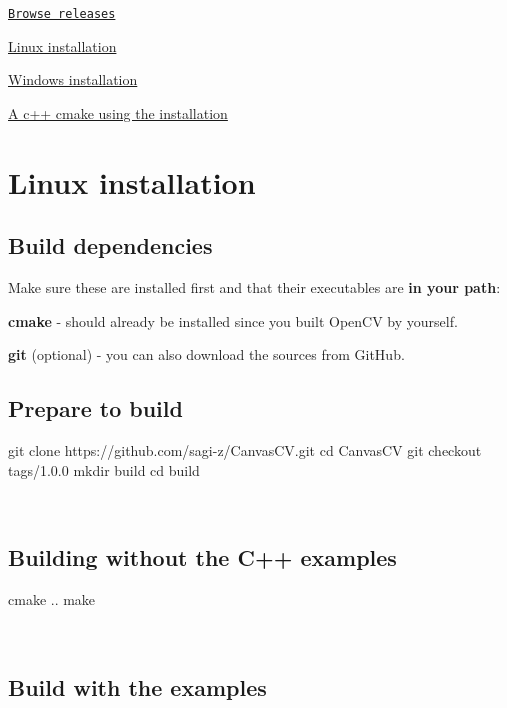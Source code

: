 
\begin{DoxyItemize}
\item \href{https://github.com/sagi-z/CanvasCV/releases}{\tt Browse releases}
\item \hyperlink{installlinux}{Linux installation}
\item \hyperlink{installwindows}{Windows installation}
\item \hyperlink{cmake}{A c++ cmake using the installation} 
\end{DoxyItemize}\hypertarget{installlinux}{}\section{Linux installation}\label{installlinux}
\hypertarget{installlinux_ilsec1}{}\subsection{Build dependencies}\label{installlinux_ilsec1}
Make sure these are installed first and that their executables are {\bfseries in your path}\+:
\begin{DoxyItemize}
\item {\bfseries cmake} -\/ should already be installed since you built Open\+CV by yourself.
\item {\bfseries git} (optional) -\/ you can also download the sources from Git\+Hub. ~\newline

\end{DoxyItemize}\hypertarget{installlinux_ilsec2}{}\subsection{Prepare to build}\label{installlinux_ilsec2}
\begin{DoxyVerb}git clone https://github.com/sagi-z/CanvasCV.git
cd CanvasCV
git checkout tags/1.0.0
mkdir build
cd build
\end{DoxyVerb}
 ~\newline
\hypertarget{installlinux_ilsec3}{}\subsection{Building without the C++ examples}\label{installlinux_ilsec3}
\begin{DoxyVerb}cmake ..
make
\end{DoxyVerb}
 ~\newline
\hypertarget{installlinux_ilsec4}{}\subsection{Build with the examples}\label{installlinux_ilsec4}
